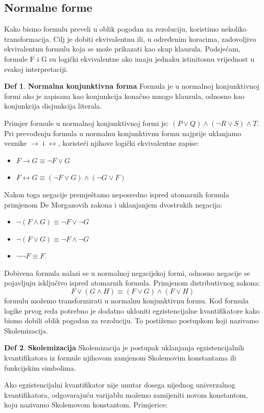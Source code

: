 \documentclass{article}
\theoremstyle{definition}
\newtheorem{definicija}{Def}[section]
\theoremstyle{plain}
\begin{document}
\subsection*{Normalne forme}
Kako bismo formulu preveli u oblik pogodan za rezoluciju, koristimo nekoliko transformacija. Cilj je dobiti ekvivalentnu ili, u određenim koracima, zadovoljivo ekvivalentnu formulu koja se može prikazati kao skup klauzula. Podsjećam, formule F i G su logički ekvivalentne ako imaju jednaku istinitosnu vrijednost u svakoj interpretaciji.
\begin{definicija}\textbf{Normalna konjunktivna forma}\newline
Formula je u normalnoj konjunktivnoj formi ako je zapisana kao konjunkcija konačno mnogo klauzula, odnosno kao konjunkcija disjunkcija literala.
\end{definicija}
Primjer formule u normalnoj konjunktivnoj formi je:
$(P\lor Q)\land(\neg R\lor S)\land T$.
Pri prevođenju formula u normalnu konjunktivnu formu najprije uklanjamo veznike $\rightarrow$ i $\leftrightarrow$, koristeći njihove logički ekvivalentne zapise:\begin{itemize}
    \item $F\rightarrow G \equiv \neg F\lor G$
    \item $F\leftrightarrow G \equiv
        (\neg F\lor G)\land(\neg G\lor F)$
\end{itemize}
Nakon toga negacije premještamo neposredno ispred atomarnih formula primjenom De Morganovih zakona i uklanjanjem dvostrukih negacija:
\begin{itemize}
    \item $\neg(F\land G)\equiv \neg F\lor\neg G$
    \item $\neg(F\lor G)\equiv \neg F\land\neg G$
    \item $\neg\neg F\equiv F.$
\end{itemize}
Dobivena formula nalazi se u normalnoj negacijskoj formi, odnosno negacije se pojavljuju isključivo ispred atomarnih formula. Primjenom distributivnog zakona:\[F\lor(G\land H)\equiv
(F\lor G)\land(F\lor H)\]
formulu možemo transformirati u normalnu konjunktivnu formu.
Kod formula logike prvog reda potrebno je dodatno ukloniti egzistencijalne kvantifikatore kako bismo dobili oblik pogodan za rezoluciju. To postižemo postupkom koji nazivamo Skolemizacija.
\begin{definicija}\textbf{Skolemizacija}\newline
Skolemizacija je postupak uklanjanja egzistencijalnih kvantifikatora iz formule njihovom zamjenom Skolemovim konstantama ili funkcijskim simbolima.
\end{definicija}
Ako egzistencijalni kvantifikator nije unutar dosega nijednog univerzalnog kvantifikatora, odgovarajuću varijablu možemo zamijeniti novom konstantom, koju nazivamo Skolemovom konstantom. Primjerice:
\end{document}
